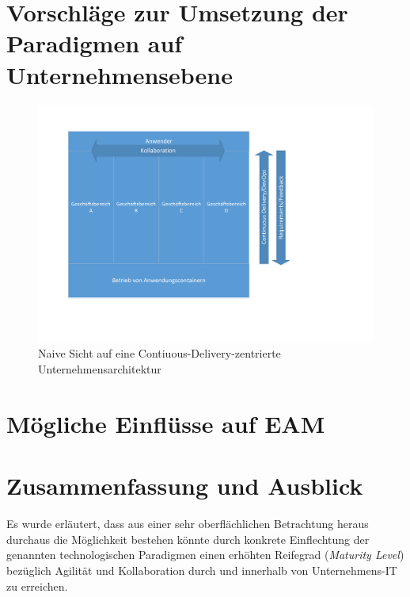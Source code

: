 \documentclass{llncs}
\begin{document}
\section{Vorschläge zur Umsetzung der Paradigmen auf Unternehmensebene}

\begin{figure}[ht!]
	\centering
  \includegraphics[scale=0.5]{simple_diagram.pdf}
	\caption{Naive Sicht auf eine Contiuous-Delivery-zentrierte Unternehmensarchitektur}
	\label{fig:model}
\end{figure}

\section{Mögliche Einflüsse auf EAM}
\section{Zusammenfassung und Ausblick}
Es wurde erläutert, dass aus einer sehr oberflächlichen Betrachtung heraus durchaus die Möglichkeit bestehen könnte durch konkrete Einflechtung der genannten technologischen Paradigmen einen erhöhten Reifegrad (\textit{Maturity Level}) bezüglich Agilität und Kollaboration durch und innerhalb von Unternehmens-IT zu erreichen.\\
\end{document}
